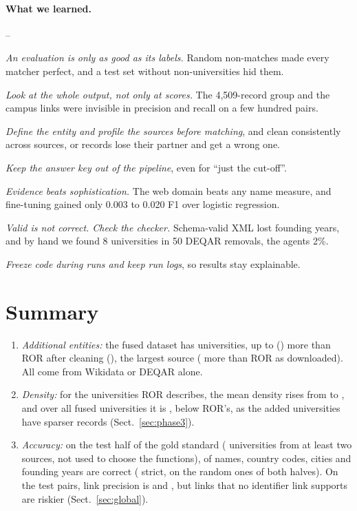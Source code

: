 \documentclass[runningheads,a4paper]{llncs}
\newenvironment{steps}[1][0.8em]{\begin{list}{--}{\setlength{\labelwidth}{#1}\setlength{\labelsep}{0.3em}%
\setlength{\leftmargin}{\dimexpr\labelwidth+\labelsep\relax}%
\setlength{\itemsep}{0pt}\setlength{\parsep}{0pt}\setlength{\topsep}{2pt}}}%
{\end{list}}
\begin{document}
\paragraph{What we learned.}
\begin{steps}
\item \emph{An evaluation is only as good as its labels.} Random non-matches made every matcher perfect, and
a test set without non-universities hid them.
\item \emph{Look at the whole output, not only at scores.} The 4,509-record group and the campus links were
invisible in precision and recall on a few hundred pairs.
\item \emph{Define the entity and profile the sources before matching}, and clean consistently across
sources, or records lose their partner and get a wrong one.
\item \emph{Keep the answer key out of the pipeline}, even for ``just the cut-off''.
\item \emph{Evidence beats sophistication.} The web domain beats any name measure, and fine-tuning
gained only 0.003 to 0.020 F1 over logistic regression.
\item \emph{Valid is not correct. Check the checker.} Schema-valid XML lost founding years, and by hand we
found 8 universities in 50 DEQAR removals, the agents 2\%.
\item \emph{Freeze code during runs and keep run logs}, so results stay explainable.
\end{steps}

\section{Summary}\label{sec:conclusion}

\begin{enumerate}
\item \emph{Additional entities:} the fused dataset has \nFused{} universities, up to \nAdded{} (\pctAdded{}) more
than ROR after cleaning (\nRor{}), the largest source (\nAddedRaw{} more than ROR as downloaded). All
come from Wikidata or DEQAR alone.
\item \emph{Density:} for the universities ROR describes, the mean density rises from \densRor{} to
\densFusedRor{}, and over all fused universities it is \densFused{}, below ROR's, as the added universities
have sparser records (Sect.~\ref{sec:phase3}).
\item \emph{Accuracy:} on the test half of the gold standard (\goldUsed{} universities from at least two
sources, not used to choose the functions), \accFinal{} of names, country codes, cities and founding years
are correct (\accFinalStrict{} strict, \accRandom{} on the \goldRandomUsed{} random ones of both halves). On the test
pairs, link precision is \wrTestP{} and \drTestP{}, but links that no identifier link supports are
riskier (Sect.~\ref{sec:global}).
\end{enumerate}
\end{document}
